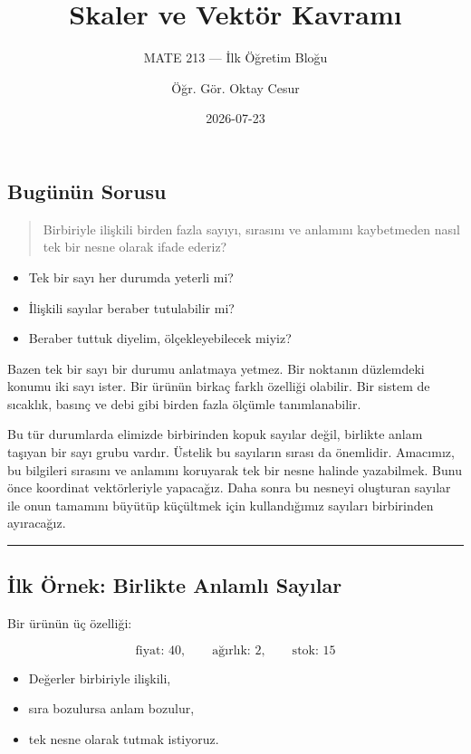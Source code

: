 \documentclass[
  a4paper,
  DIV=11,
  numbers=noendperiod]{scrartcl}
\title{Skaler ve Vektör Kavramı}
\subtitle{MATE 213 --- İlk Öğretim Bloğu}
\author{Öğr. Gör. Oktay Cesur}
\date{2026-07-23}
\providecommand{\tightlist}{%
  \setlength{\itemsep}{0pt}\setlength{\parskip}{0pt}}
\begin{document}
\maketitle


\subsection{Bugünün Sorusu}\label{buguxfcnuxfcn-sorusu}

\begin{quote}
Birbiriyle ilişkili birden fazla sayıyı, sırasını ve anlamını
kaybetmeden nasıl tek bir nesne olarak ifade ederiz?
\end{quote}

\begin{itemize}
\tightlist
\item
  Tek bir sayı her durumda yeterli mi?\\
\item
  İlişkili sayılar beraber tutulabilir mi?
\item
  Beraber tuttuk diyelim, ölçekleyebilecek miyiz?
\end{itemize}

Bazen tek bir sayı bir durumu anlatmaya yetmez. Bir noktanın düzlemdeki
konumu iki sayı ister. Bir ürünün birkaç farklı özelliği olabilir. Bir
sistem de sıcaklık, basınç ve debi gibi birden fazla ölçümle
tanımlanabilir.

Bu tür durumlarda elimizde birbirinden kopuk sayılar değil, birlikte
anlam taşıyan bir sayı grubu vardır. Üstelik bu sayıların sırası da
önemlidir. Amacımız, bu bilgileri sırasını ve anlamını koruyarak tek bir
nesne halinde yazabilmek. Bunu önce koordinat vektörleriyle yapacağız.
Daha sonra bu nesneyi oluşturan sayılar ile onun tamamını büyütüp
küçültmek için kullandığımız sayıları birbirinden ayıracağız.

\begin{center}\rule{0.5\linewidth}{0.5pt}\end{center}

\subsection{İlk Örnek: Birlikte Anlamlı
Sayılar}\label{ilk-uxf6rnek-birlikte-anlamlux131-sayux131lar}

Bir ürünün üç özelliği:

\[
\text{fiyat: }40,\qquad
\text{ağırlık: }2,\qquad
\text{stok: }15
\]

\begin{itemize}
\tightlist
\item
  Değerler birbiriyle ilişkili,
\item
  sıra bozulursa anlam bozulur,
\item
  tek nesne olarak tutmak istiyoruz.
\end{itemize}
\end{document}
